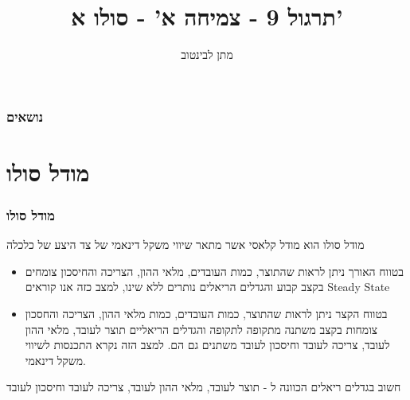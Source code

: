 \documentclass[usenames,dvipsnames]{beamer}
\title{תרגול 9 - צמיחה א' - סולו א'}
\author{\texthebrew{ מתן לבינטוב}}
\institute[{{ אב"ג}}]{{ אוניברסיטת בן גוריון בנגב}}
\date{}
\begin{document}
\begin{RTL}
\begin{frame}
\titlepage
\end{frame}
\begin{frame}
    \frametitle{נושאים}
    \tableofcontents

    

\end{frame}

\section{מודל סולו}
\begin{frame}[allowframebreaks]
    \frametitle{מודל סולו}
    מודל סולו הוא מודל קלאסי אשר מתאר שיווי משקל דינאמי של צד היצע של כלכלה
    \begin{itemize}
        \item בטווח האורך  ניתן לראות שהתוצר, כמות העובדים, מלאי ההון, הצריכה והחיסכון צומחים בקצב קבוע והגדלים הריאלים נותרים ללא שינו, למצב כזה אנו קוראים Steady State
        \item בטווח הקצר ניתן לראות שהתוצר, כמות העובדים, כמות מלאי ההון, הצריכה והחסכון צומחות
        בקצב משתנה מתקופה לתקופה והגדלים הריאליים תוצר לעובד, מלאי ההון לעובד, צריכה
        לעובד וחיסכון לעובד  משתנים גם הם. למצב הזה נקרא התכנסות לשיווי משקל דינאמי.
    \end{itemize}
    \begin{alertblock}{חשוב}
        בגדלים ריאלים הכוונה ל - תוצר לעובד, מלאי ההון לעובד, צריכה לעובד
        וחיסכון לעובד
    \end{alertblock}

    \framebreak

    

\end{frame}
\end{RTL}
\end{document}
